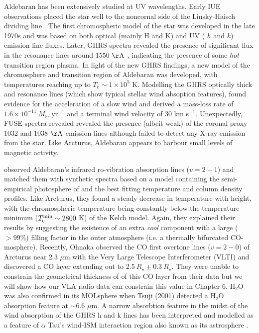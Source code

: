 Aldebaran has been extensively studied at UV wavelengths. Early IUE observations placed the star well to the noncornal side of the Linsky-Haisch dividing line \citep{linsky_1979}. The first chromospheric model of the star was developed in the late 1970s \citep{kelch_1978} and was based on both optical (mainly  H and K) and UV ( $h$ and $k$) emission line fluxes. Later, GHRS spectra revealed the presence of significant flux in the  resonance lines around 1550 $\rm{\AA}$ \citep{carpenter_1996}, indicating the presence of some \textit{hot} transition region plasma. In light of the new GHRS findings, a new model of the chromosphere and transition region of Aldebaran was developed, with temperatures reaching up to $T_{e} \sim 1\times 10^5$ K. Modelling the GHRS optically thick  and  resonance lines (which show typical stellar wind absoption features), \cite{robinson_1998} found evidence for the acceleration of a slow wind and derived a mass-loss rate of $1.6\times 10^{-11} \ M_{\odot}$ yr$^{-1}$ and a terminal wind velocity of 30 km s$^{-1}$. Unexpectedly, FUSE spectra revealed revealed the presence (albeit weak) of the coronal proxy  1032 and 1038 $\rm{\AA}$ emission lines \citep{dupree_2005} although \cite{ayres_2003} failed to detect any X-ray emission from the star. Like Arcturus, Aldebaran appears to harbour small levels of magnetic activity.

\cite{wiedemann_1994} observed Aldebaran's infrared ro-vibration absorption lines ($v=2-1$) and matched them with synthetic spectra based on a model containing the semi-empirical photosphere of \cite{kelch_1978} and the best fitting temperature and column density profiles. Like Arcturus, they found a steady decrease in temperature with height, with the chromospheric temperature being constantly below the temperature minimum ($T ^{\rm{min}} _{\rm{e}} \sim 2800$ K) of the Kelch model. Again, they explained their results by suggesting the existence of an extra \textit{cool} component with a large ($> 99 \%$) filling factor in the outer atmosphere (i.e. a thermally bifurcated  CO-mosphere). Recently, Ohnaka observed the CO first overtone lines ($v=2-0$) of Arcturus near 2.3 $\mu$m with the Very Large Telescope Interferometer (VLTI) and discovered a CO layer extending out to $2.5\ R_{\star} \pm 0.3 \ R_{\star}$. They were unable to constrain the geometrical thickness of of this CO layer from their data but we will show how our VLA radio data can constrain this value in Chapter 6. H$_{2}$O was also confirmed in its MOLsphere  when Tsuji (2001) detected a H$_{2}$O absorption feature at $\sim6.6$ $\mu$m. A narrow absorbtion feature in the midst of the wind absorption of the GHRS  h  and k  lines has been interpreted and modelled as a feature of $\alpha$ Tau's wind-ISM interaction region also known as its astrosphere \citep{wood_2007}. 

